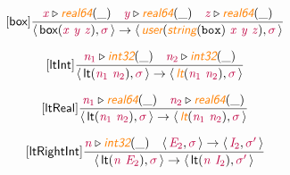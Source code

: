 \documentclass[10pt,leqno,fleqn]{article}
\newcommand{\artVariable}[1]{\mbox{\color{purple}\em #1\/}}
\newcommand{\artConstructor}[1]{\mbox{\sf #1}}
\newcommand{\artCaseInsensitiveLiteral}[1]{\mbox{\tt #1}}
\newcommand{\artSpecial}[1]{\mbox{\color{orange}\sf\em #1}}
\begin{document}
\begin{equation}
\tag*{[\artConstructor{\sf box}]}
\begin{split}\frac{ \artVariable{x}\triangleright \artSpecial{real64}(\_) \quad  \artVariable{y}\triangleright \artSpecial{real64}(\_) \quad  \artVariable{z}\triangleright \artSpecial{real64}(\_) }{\langle\, \artConstructor{\sf box}(\artVariable{x}\ \artVariable{y}\ \artVariable{z}), \artVariable{$\sigma$}\,\rangle \rightarrow \langle\, \artSpecial{user}(\artSpecial{string}(\artCaseInsensitiveLiteral{box})\ \artVariable{x}\ \artVariable{y}\ \artVariable{z}), \artVariable{$\sigma$}\,\rangle }
\end{split}
\end{equation}

\begin{equation}
\tag*{[\artConstructor{\sf ltInt}]}
\begin{split}\frac{ \artVariable{n$_{1}$}\triangleright \artSpecial{int32}(\_) \quad  \artVariable{n$_{2}$}\triangleright \artSpecial{int32}(\_) }{\langle\, \artConstructor{\sf lt}(\artVariable{n$_{1}$}\ \artVariable{n$_{2}$}), \artVariable{$\sigma$}\,\rangle \rightarrow \langle\, \artSpecial{lt}(\artVariable{n$_{1}$}\ \artVariable{n$_{2}$}), \artVariable{$\sigma$}\,\rangle }
\end{split}
\end{equation}

\begin{equation}
\tag*{[\artConstructor{\sf ltReal}]}
\begin{split}\frac{ \artVariable{n$_{1}$}\triangleright \artSpecial{real64}(\_) \quad  \artVariable{n$_{2}$}\triangleright \artSpecial{real64}(\_) }{\langle\, \artConstructor{\sf lt}(\artVariable{n$_{1}$}\ \artVariable{n$_{2}$}), \artVariable{$\sigma$}\,\rangle \rightarrow \langle\, \artSpecial{lt}(\artVariable{n$_{1}$}\ \artVariable{n$_{2}$}), \artVariable{$\sigma$}\,\rangle }
\end{split}
\end{equation}

\begin{equation}
\tag*{[\artConstructor{\sf ltRightInt}]}
\begin{split}\frac{ \artVariable{n}\triangleright \artSpecial{int32}(\_) \quad \langle\, \artVariable{E$_{2}$}, \artVariable{$\sigma$}\,\rangle \rightarrow \langle\, \artVariable{I$_{2}$}, \artVariable{$\sigma$\/$^\prime$}\,\rangle }{\langle\, \artConstructor{\sf lt}(\artVariable{n}\ \artVariable{E$_{2}$}), \artVariable{$\sigma$}\,\rangle \rightarrow \langle\, \artConstructor{\sf lt}(\artVariable{n}\ \artVariable{I$_{2}$}), \artVariable{$\sigma$\/$^\prime$}\,\rangle }
\end{split}
\end{equation}
\end{document}
